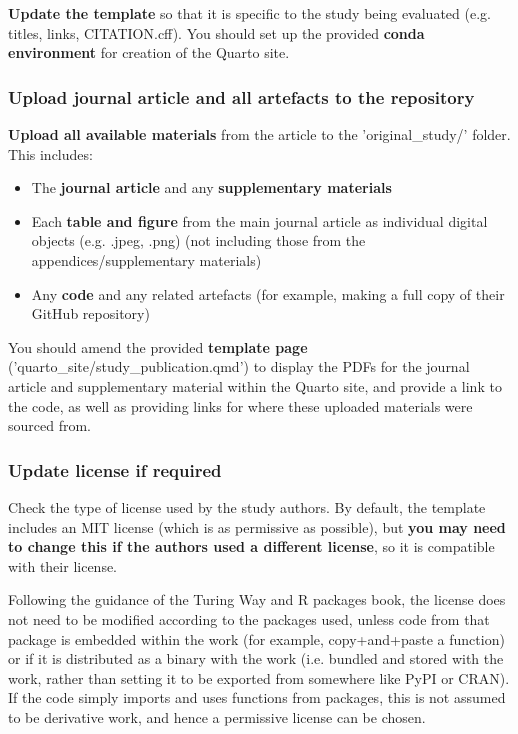 \textbf{Update the template} so that it is specific to the study being evaluated (e.g. titles, links, CITATION.cff). You should set up the provided \textbf{conda environment} for creation of the Quarto site.

\vspace{0.5cm}
\subsubsection{Upload journal article and all artefacts to the repository}

 \textbf{Upload all available materials} from the article to the 'original\_study/' folder. This includes:
\begin{itemize}
    \item The \textbf{journal article} and any \textbf{supplementary materials}
    \item Each \textbf{table and figure} from the main journal article as individual digital objects (e.g. .jpeg, .png) (not including those from the appendices/supplementary materials)
    \item Any \textbf{code} and any related artefacts (for example, making a full copy of their GitHub repository)
\end{itemize}

You should amend the provided \textbf{template page} ('quarto\_site/study\_publication.qmd') to display the PDFs for the journal article and supplementary material within the Quarto site, and provide a link to the code, as well as providing links for where these uploaded materials were sourced from.

\subsubsection{Update license if required}

Check the type of license used by the study authors. By default, the template includes an MIT license (which is as permissive as possible), but \textbf{you may need to change this if the authors used a different license}, so it is compatible with their license.

Following the guidance of the Turing Way\autocite{the_turing_way_community_turing_2022} and R packages book,\autocite{wickham_12_2023} the license does not need to be modified according to the packages used, unless code from that package is embedded within the work (for example, copy+and+paste a function) or if it is distributed as a binary with the work (i.e. bundled and stored with the work, rather than setting it to be exported from somewhere like PyPI or CRAN). If the code simply imports and uses functions from packages, this is not assumed to be derivative work, and hence a permissive license can be chosen.

